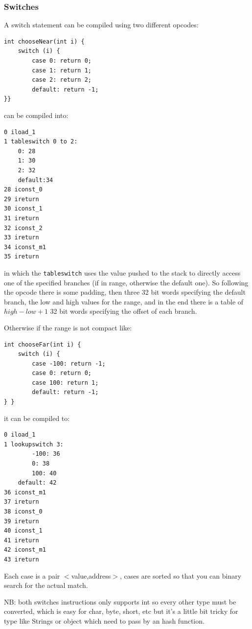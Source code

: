\subsubsection{Switches}
A switch statement can be compiled using two different opcodes:
\begin{verbatim}
int chooseNear(int i) {
    switch (i) {
        case 0: return 0;
        case 1: return 1;
        case 2: return 2;
        default: return -1;
}}
\end{verbatim}
can be compiled into:
\begin{verbatim}
0 iload_1
1 tableswitch 0 to 2:
    0: 28
    1: 30
    2: 32
    default:34
28 iconst_0
29 ireturn
30 iconst_1
31 ireturn
32 iconst_2
33 ireturn
34 iconst_m1
35 ireturn
\end{verbatim}
in which the \verb|tableswitch| uses the value pushed to the stack to directly access one of the specified branches (if in range, otherwise the default one).
So following the opcode there is some padding, then three 32 bit words specifying the default branch, the low and high values for the range, and in the end there is a table of $high-low+1$ 32 bit words specifying the offset of each branch.

Otherwise if the range is not compact like:
\begin{verbatim}
int chooseFar(int i) {
    switch (i) {
        case -100: return -1;
        case 0: return 0;
        case 100: return 1;
        default: return -1;
} }
\end{verbatim}
it can be compiled to:
\begin{verbatim}
0 iload_1
1 lookupswitch 3:
        -100: 36
        0: 38
        100: 40
    default: 42
36 iconst_m1
37 ireturn
38 iconst_0
39 ireturn
40 iconst_1
41 ireturn
42 iconst_m1
43 ireturn
\end{verbatim}
Each case is a pair $<$value,address$>$, cases are sorted so that you can binary search for the actual match.

NB: both switches instructions only supports int so every other type must be converted, which is easy for char, byte, short, etc but it's a little bit tricky for type like Strings or object which need to pass by an hash function.

